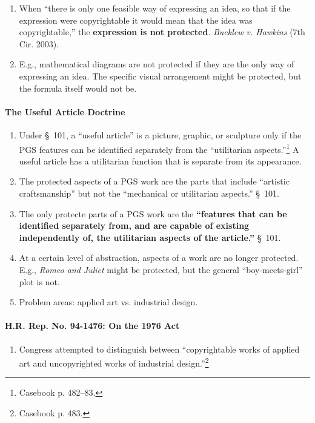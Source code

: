 \begin{enumerate}
    \item When ``there is only one feasible way of expressing an idea, so that 
    if the expression were copyrightable it would mean that the idea was 
    copyrightable,'' the \textbf{expression is not protected}. \emph{Bucklew 
    v. Hawkins} (7th Cir. 2003).
    \item E.g., mathematical diagrams are not protected if they are the only 
    way of expressing an idea. The specific visual arrangement might be 
    protected, but the formula itself would not be.
\end{enumerate}

\paragraph{The Useful Article Doctrine}

\begin{enumerate}
    \item Under \S\ 101, a ``useful article'' is a picture, graphic, or 
    sculpture only if the PGS features can be identified separately from the 
    ``utilitarian aspects.''\footnote{Casebook p. 482--83.} A useful article 
    has a utilitarian function that is separate from its appearance.
    \item The protected aspects of a PGS work are the parts that include 
    ``artistic craftsmanship'' but not the ``mechanical or utilitarian 
    aspects.'' \S\ 101.
    \item The only protecte parts of a PGS work are the \textbf{``features 
    that can be identified separately from, and are capable of existing 
    independently of, the utilitarian aspects of the article.''} \S\ 101.
    \item At a certain level of abstraction, aspects of a work are no longer 
    protected. E.g., \emph{Romeo and Juliet} might be protected, but the 
    general ``boy-meets-girl'' plot is not.
    \item Problem areas: applied art vs. industrial design.
\end{enumerate}

\paragraph{H.R. Rep. No. 94-1476: On the 1976 Act}

\begin{enumerate}
    \item Congress attempted to distinguish between ``copyrightable works of 
    applied art and uncopyrighted works of industrial 
    design.''\footnote{Casebook p. 483.}
\end{enumerate}


